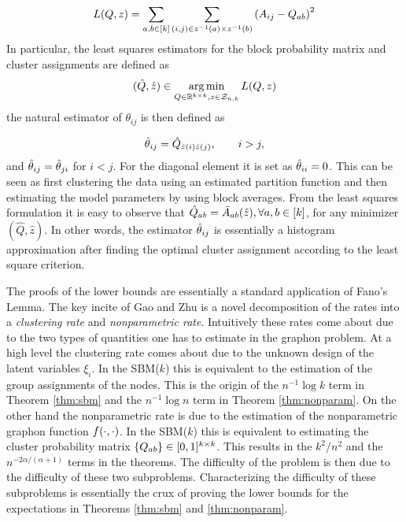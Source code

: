 \documentclass[11pt]{article}
\begin{document}
\[ L(Q,z) = \sum_{a,b\in\lbrack k\rbrack} \sum_{(i,j)\in z^{-1}(a) \times z^{-1}(b)} \left( A_{ij} - Q_{ab} \right)^2  \]
In particular, the least squares estimators for the block probability matrix and cluster assignments are defined as
\begin{equation}
\begin{aligned}
( \hat{Q}, \hat{z} ) \in \operatorname*{arg\,min}_{Q \in \mathbb{R}^{k \times k}, z \in \mathcal{Z}_{n,k}}  L(Q,z)
\end{aligned}
\end{equation}
the natural estimator of $\theta_{ij}$ is then defined as

\begin{equation}
\begin{aligned}
\hat{\theta}_{ij} = \hat{Q}_{\hat{z}(i)\hat{z}(j)}, \qquad i > j,
\end{aligned}
\end{equation}
and $\hat{\theta}_{ij} = \hat{\theta}_{ji}$ for $i<j$. For the diagonal element it is set as $\hat{\theta}_{ii} = 0$. This can be seen as first clustering the data using an estimated partition function and then estimating the model parameters by using block averages. From the least squares formulation it is easy to observe that $\hat{Q}_{ab} = \bar{A}_{ab}(\hat{z}), \forall a,b \in \lbrack k\rbrack$, for any minimizer $( \hat{Q}, \hat{z} )$. In other words, the estimator $\hat{\theta}_{ij}$ is essentially a histogram approximation after finding the optimal cluster assignment according to the least square criterion.

The proofs of the lower bounds are essentially a standard application of Fano's Lemma. The key incite of Gao and Zhu is a novel decomposition of the rates into a \textit{clustering rate} and \textit{nonparametric rate}. Intuitively these rates come about due to the two types of quantities one has to estimate in the graphon problem. At a high level the clustering rate comes about due to the unknown design of the latent variables $\xi_i$. In the SBM($k$) this is equivalent to the estimation of the group assignments of the nodes. This is the origin of the $n^{-1} \log k$ term in Theorem \ref{thm:sbm} and the $n^{-1} \log n$ term in Theorem \ref{thm:nonparam}. On the other hand the nonparametric rate is due to the estimation of the nonparametric graphon function $f(\cdot, \cdot)$. In the SBM($k$) this is equivalent to estimating the cluster probability matrix $\{Q_{ab}\} \in [0, 1]^{k \times k}$. This results in the $k^2 /n^2$ and the $n^{-2\alpha/(\alpha + 1)}$ terms in the theorems. The difficulty of the problem is then due to the difficulty of these two subproblems. Characterizing the difficulty of these subproblems is essentially the crux of proving the lower bounds for the expectations in Theorems \ref{thm:sbm} and \ref{thm:nonparam}.
\end{document}
